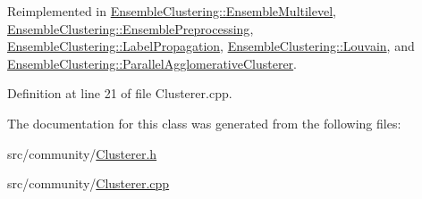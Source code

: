 Reimplemented in \hyperlink{class_ensemble_clustering_1_1_ensemble_multilevel_a18d80c7285dfbf236306908804e45af8}{Ensemble\-Clustering\-::\-Ensemble\-Multilevel}, \hyperlink{class_ensemble_clustering_1_1_ensemble_preprocessing_abbd5ff18c5507f2867d9ff5a585e4331}{Ensemble\-Clustering\-::\-Ensemble\-Preprocessing}, \hyperlink{class_ensemble_clustering_1_1_label_propagation_a1672735899b9c00e797f0270638fba7f}{Ensemble\-Clustering\-::\-Label\-Propagation}, \hyperlink{class_ensemble_clustering_1_1_louvain_af86f67cf0c83abf0af7c149c158342c5}{Ensemble\-Clustering\-::\-Louvain}, and \hyperlink{class_ensemble_clustering_1_1_parallel_agglomerative_clusterer_a1b14e2b84b9541e49df16a2e8401d4b9}{Ensemble\-Clustering\-::\-Parallel\-Agglomerative\-Clusterer}.



Definition at line 21 of file Clusterer.\-cpp.



The documentation for this class was generated from the following files\-:\begin{DoxyCompactItemize}
\item 
src/community/\hyperlink{_clusterer_8h}{Clusterer.\-h}\item 
src/community/\hyperlink{_clusterer_8cpp}{Clusterer.\-cpp}\end{DoxyCompactItemize}
